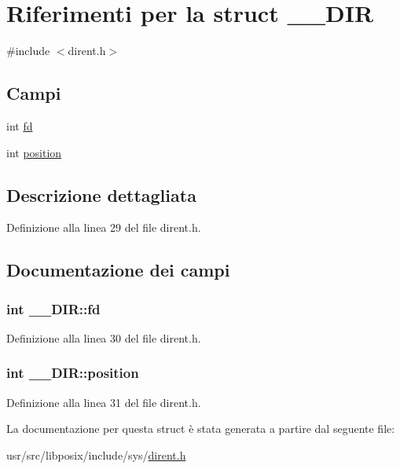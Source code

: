 \hypertarget{struct____DIR}{\section{Riferimenti per la struct \+\_\+\+\_\+\+D\+I\+R}
\label{struct____DIR}
}


{\ttfamily \#include $<$dirent.\+h$>$}

\subsection*{Campi}
\begin{DoxyCompactItemize}
\item 
int \hyperlink{struct____DIR_ae243fc79067063164eb8ec212e6a9e80}{fd}
\item 
int \hyperlink{struct____DIR_adcec35c0ea0ed4342c5425c494554397}{position}
\end{DoxyCompactItemize}


\subsection{Descrizione dettagliata}


Definizione alla linea 29 del file dirent.\+h.



\subsection{Documentazione dei campi}
\hypertarget{struct____DIR_ae243fc79067063164eb8ec212e6a9e80}{
\subsubsection[{fd}]{\setlength{\rightskip}{0pt plus 5cm}int \+\_\+\+\_\+\+D\+I\+R\+::fd}}\label{struct____DIR_ae243fc79067063164eb8ec212e6a9e80}


Definizione alla linea 30 del file dirent.\+h.

\hypertarget{struct____DIR_adcec35c0ea0ed4342c5425c494554397}{
\subsubsection[{position}]{\setlength{\rightskip}{0pt plus 5cm}int \+\_\+\+\_\+\+D\+I\+R\+::position}}\label{struct____DIR_adcec35c0ea0ed4342c5425c494554397}


Definizione alla linea 31 del file dirent.\+h.



La documentazione per questa struct è stata generata a partire dal seguente file\+:\begin{DoxyCompactItemize}
\item 
usr/src/libposix/include/sys/\hyperlink{dirent_8h}{dirent.\+h}\end{DoxyCompactItemize}
